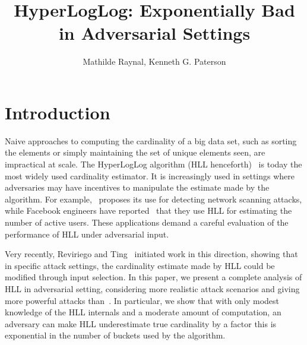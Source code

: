 \documentclass{IEEEtran}
\title{\huge HyperLogLog: Exponentially Bad in Adversarial Settings}
\author{Mathilde Raynal, Kenneth G. Paterson}
\begin{document}
\maketitle


\IEEEdisplaynontitleabstractindextext

\section{Introduction}
Naive approaches to computing the cardinality of a big data set, such as sorting the elements or simply maintaining the set of unique elements seen, are impractical at scale. The HyperLogLog algorithm (HLL henceforth)~\cite{HLL } is today the most widely used cardinality estimator. It is increasingly used in settings where adversaries may have  incentives to manipulate the estimate made by the algorithm. For example,~\cite{} proposes its use for detecting network scanning attacks, while Facebook engineers have reported~\cite{} that they use HLL for estimating the number of active users. These applications demand a careful evaluation of the performance of HLL under adversarial input. 

Very recently, Reviriego and Ting~\cite{hllvuln} initiated work in this direction, showing that in specific attack settings, the cardinality estimate made by HLL could be modified through input selection. In this paper, we present a complete analysis of HLL in adversarial setting, considering more realistic attack scenarios and giving more powerful attacks than~\cite{hllvuln}. In particular, we show that with only modest knowledge of the HLL internals and a moderate amount of computation, an adversary can make HLL underestimate true cardinality by a factor this is exponential in the number of buckets used by the algorithm.
\end{document}
